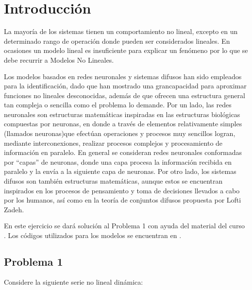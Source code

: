\documentclass[12pt]{article}
\begin{document}

\tableofcontents
\listoffigures
\listoftables
\afterpage{\null\newpage}
\newpage
\thispagestyle{empty}
\pagebreak
\newpage
\setcounter{page}{1}


\section{Introducción}

La  mayoría  de  los  sistemas  tienen  un  comportamiento  no  lineal,  excepto  en  un determinado rango de operación donde pueden ser considerados lineales. En ocasiones un modelo lineal es insuficiente para explicar un fenómeno por lo que se debe recurrir a Modelos No Lineales.

Los modelos basados en redes neuronales y sistemas difusos han sido empleados para la identificación, dado que han mostrado una grancapacidad para aproximar funciones no lineales desconocidas, además de que ofrecen una estructura general tan compleja o sencilla como el problema lo demande. Por un lado, las redes neuronales son estructuras matemáticas inspiradas en las estructuras biológicas compuestas por neuronas, en donde a través de elementos relativamente simples (llamados neuronas)que efectúan operaciones y procesos muy sencillos logran, mediante interconexiones, realizar procesos complejos y procesamiento de información en paralelo. En general se consideran redes neuronales conformadas por “capas” de neuronas, donde una capa procesa la información recibida en paralelo y la envía a la siguiente capa de neuronas. Por otro lado, los sistemas difusos son también estructuras matemáticas, aunque estos se encuentran inspirados en los procesos de pensamiento y toma de decisiones llevados a cabo por los humanos, así como en la teoría de conjuntos difusos propuesta por Lofti Zadeh.

En este ejercicio se dará solución al Problema 1 con ayuda del material del curso \cite{doris1}\cite{doris2}. Los códigos utilizados para los modelos se encuentran en \cite{git}.


\subsection{Problema 1}

Considere la siguiente serie no lineal dinámica:
\end{document}
